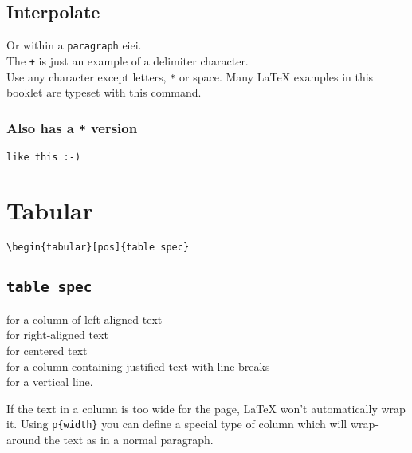 \documentclass[a4paper]{article}
\begin{document}
\subsection{Interpolate}
Or within a \verb+paragraph+ eiei.\\
The \verb|+| is just an example of a delimiter character.\\
Use any character except letters, \verb|*| or space. Many \LaTeX{} examples in this booklet are typeset with this command.

\subsubsection*{Also has a \texttt{*} version}
\verb*|like this :-) |

\newpage
\section{Tabular}
\begin{verbatim}
\begin{tabular}[pos]{table spec}
\end{verbatim}

\subsection*{\texttt{table spec}}
 for a column of left-aligned text\\
 for right-aligned text\\
 for centered text\\
 for a column containing justified text with line breaks\\
\fbox{\textbar} for a vertical line.

If the text in a column is too wide for the page, \LaTeX{} won't automatically wrap it.
Using \verb+p{width}+ you can define a special type of column which will wrap-around the text as in a normal paragraph.
\end{document}
